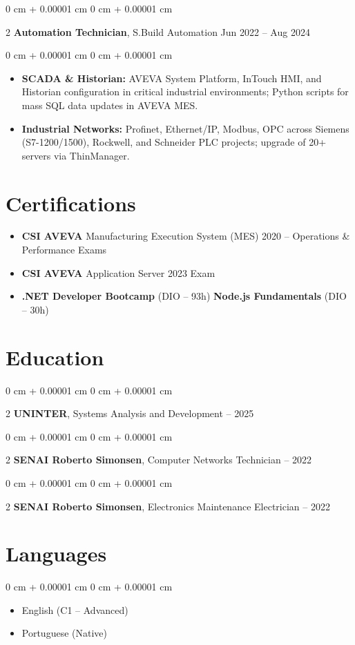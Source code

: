 \documentclass[10pt, letterpaper]{article}
\newenvironment{highlights}{ \begin{itemize}[ topsep=0.10 cm, parsep=0.10 cm, partopsep=0pt,
itemsep=0pt, leftmargin=0 cm + 10pt ] }{ \end{itemize} }
\newenvironment{onecolentry}{ \begin{adjustwidth}{ 0 cm + 0.00001 cm }{ 0 cm + 0.00001 cm }
}{ \end{adjustwidth} }
\newenvironment{twocolentry}[2][]{ \onecolentry \def\secondColumn{#2} \setcolumnwidth{\fill, 4.5 cm}
\begin{paracol}{2} }{ \switchcolumn \raggedleft \secondColumn \end{paracol}
\endonecolentry }
\begin{document}
	\vspace{0.2 cm}

	\begin{twocolentry}
		{ Jun 2022 -- Aug 2024 } \textbf{Automation Technician}, S.Build Automation
	\end{twocolentry}

	\vspace{0.10 cm}
	\begin{onecolentry}
		\begin{highlights}
			\item \textbf{SCADA \& Historian:} AVEVA System Platform, InTouch HMI, and Historian configuration in critical industrial environments; Python scripts for mass SQL data updates in AVEVA MES.
            \item \textbf{Industrial Networks:} Profinet, Ethernet/IP, Modbus, OPC across Siemens (S7-1200/1500), Rockwell, and Schneider PLC projects; upgrade of 20+ servers via ThinManager.
		\end{highlights}
	\end{onecolentry}

    \section{Certifications}

    \begin{highlights}
        \item \textbf{CSI AVEVA} Manufacturing Execution System (MES) 2020 -- Operations \& Performance Exams
        \item \textbf{CSI AVEVA} Application Server 2023 Exam
        \item \textbf{.NET Developer Bootcamp} (DIO -- 93h) \quad \textbf{Node.js Fundamentals} (DIO -- 30h)
    \end{highlights}

	\section{Education}

	\begin{twocolentry}
		{2023 -- 2025} \textbf{UNINTER}, Systems Analysis and Development
	\end{twocolentry}

	\begin{twocolentry}
		{2021 -- 2022} \textbf{SENAI Roberto Simonsen}, Computer Networks Technician
	\end{twocolentry}

    \begin{twocolentry}
		{2020 -- 2022} \textbf{SENAI Roberto Simonsen}, Electronics Maintenance Electrician
	\end{twocolentry}

	\section{Languages}

	\begin{onecolentry}
		\begin{highlights}
			\item English (C1 -- Advanced)
			\item Portuguese (Native)
		\end{highlights}
	\end{onecolentry}
\end{document}
